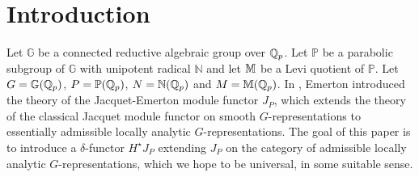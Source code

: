 \documentclass[10pt]{amsart}
\begin{document}
\newtheorem{theorem}{Theorem}[section]
\newtheorem{lemma}[theorem]{Lemma}
\newtheorem{proposition}[theorem]{Proposition}
\newtheorem{corollary}[theorem]{Corollary}
\newtheorem{conjecture}[theorem]{Conjecture}
\theoremstyle{definition}
\newtheorem{definition}[theorem]{Definition}
\newtheorem{claim}[theorem]{Claim}
\newtheorem{remark}[theorem]{Remark}
\newtheorem{example}[theorem]{Example}


\begin{abstract}
Let $G$ be a $p$-adic Lie group associated to associated to a connected reductive group over $\qp$. Let $P$ 
be a parabolic subgroup of $G$ and let $M$ be a Levi quotient of $P$. In this paper, we define a $\delta$-functor $H^{\star}J_{P}$ from the category of admissible locally analytic $G$-representations to the category of essentially admissible locally analytic $M$-representations that extends the Jacquet-Emerton module functor $J_{P}$ defined in \cite{Jacquet1}. 
\end{abstract}

\maketitle

\tableofcontents

\vspace{3mm}


\section{Introduction}\label{sec:intro}
Let $\mathbb{G}$ be a connected reductive algebraic group over $\qp$. Let $\mathbb{P}$ be a parabolic subgroup of $\mathbb{G}$ with unipotent radical $\mathbb{N}$ and let $\mathbb{M}$ be a Levi quotient of $\mathbb{P}$. Let $G=\mathbb{G}(\mathbb{Q}_{p})$, $P=\mathbb{P}(\mathbb{Q}_{p})$, $N=\mathbb{N}(\mathbb{Q}_{p})$ and $M=\mathbb{M}(\mathbb{Q}_{p})$. In \cite{Jacquet1}, Emerton introduced the theory of the Jacquet-Emerton module functor $J_{P}$, which extends the theory of the classical Jacquet module functor on smooth $G$-representations to essentially admissible locally analytic $G$-representations. The goal of this paper is to introduce a $\delta$-functor $H^{\star}J_{P}$ extending $J_{P}$ on the category of admissible locally analytic $G$-representations, which we hope to be universal, in some suitable sense. 
\end{document}
